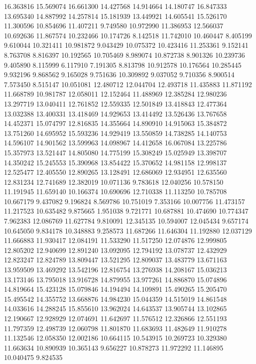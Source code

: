 16.363816
15.569074
16.661300
14.427568
14.914664
14.180747
16.847333
13.695340
14.887992
14.257814
15.181939
13.449921
14.605541
15.526170
11.300596
10.854696
11.407211
9.749580
10.972990
11.386953
12.566037
10.692636
11.867574
10.232466
10.174726
8.142518
11.742010
10.460447
8.405199
9.610044
10.321411
10.981872
9.043429
10.075372
10.423416
11.253361
9.152141
8.763708
8.816397
10.192565
10.705469
8.989074
10.872738
8.901326
10.239736
9.405890
8.115999
6.117910
7.191305
8.813798
10.912578
10.176564
10.285445
9.932196
9.868562
9.165028
9.751636
10.309892
9.037052
9.710356
8.900514
7.573450
8.515147
10.051081
12.480712
12.044704
12.493718
11.435883
11.871192
11.668789
10.981787
12.058011
12.152464
11.488969
12.385284
12.980236
13.297719
13.040411
12.761852
12.559335
12.501849
13.418843
12.477364
13.032388
13.400331
13.418469
14.929653
13.414492
13.526436
13.767658
14.452371
15.074797
12.816835
14.355664
14.890910
14.915063
15.384872
13.751260
14.695952
15.593236
14.929419
13.550859
14.738285
14.140753
14.596107
14.901562
13.599963
14.098967
14.412658
16.067084
13.225786
15.357973
13.521447
14.805080
14.775199
15.308249
15.025949
13.398707
14.350242
15.245553
15.390968
13.854422
15.370652
14.981158
12.998137
12.525477
12.405550
12.890265
13.128491
12.686069
12.934951
12.635560
12.831234
12.741689
12.382019
10.071136
9.783618
12.040256
10.578150
11.191945
11.659140
10.166374
10.690696
12.710338
11.113250
10.785708
10.667179
9.437082
9.196824
8.569786
10.751019
7.353166
10.007756
11.473157
11.217523
10.635482
9.875665
1.951038
9.721771
10.687881
10.474690
10.774347
7.962383
12.086769
11.627784
9.810091
12.345135
10.594007
12.045434
9.657174
10.645050
9.834178
10.348883
9.258573
11.687266
11.646304
11.192880
12.037129
11.666883
11.930417
12.084191
11.533290
11.517250
12.074876
12.999805
12.805202
12.940699
12.891240
13.092095
12.794192
13.078737
12.432929
12.823247
12.824789
13.809447
13.521295
12.809037
13.483779
13.671163
13.959509
13.469292
13.542196
12.816754
13.276938
14.208167
15.036213
13.173146
13.795018
13.916728
14.879955
13.977261
14.886870
15.074896
14.819664
15.423128
15.079846
14.194494
14.109891
15.490265
15.205470
15.495542
14.355752
13.668876
14.984230
15.044359
14.515019
14.861548
14.033616
14.288245
15.855610
13.962024
14.643537
13.905744
13.102865
12.190667
12.928929
12.074691
11.642697
11.576512
12.326866
12.551193
11.797359
12.498739
12.060798
11.801870
11.683693
11.482649
11.910278
11.132546
12.058350
12.002186
10.664115
10.543915
10.269723
10.329380
11.663634
10.890939
10.365143
9.656227
10.878273
11.972292
11.146895
10.040475
9.824535
